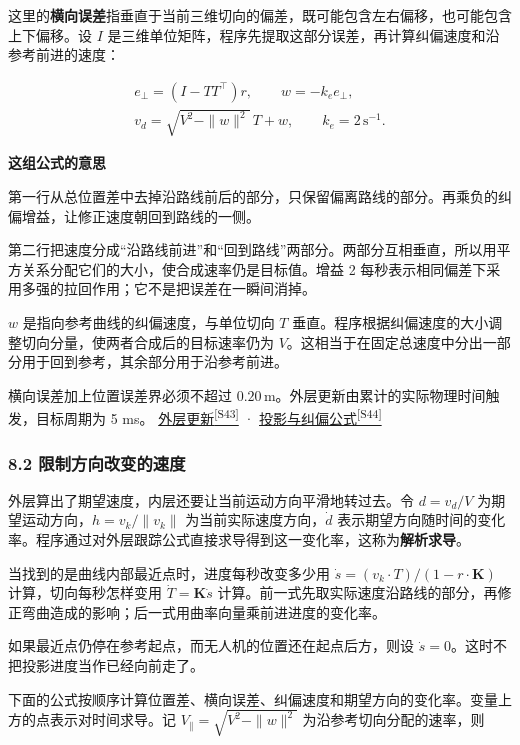 \documentclass[12pt,a4paper]{article}
\numberwithin{equation}{topic}
\newcommand{\sourceref}[2]{\hyperlink{source-#1}{#2\textsuperscript{[#1]}}}
\begin{document}
这里的\textbf{横向误差}指垂直于当前三维切向的偏差，既可能包含左右偏移，也可能包含上下偏移。设 \(I\) 是三维单位矩阵，程序先提取这部分误差，再计算纠偏速度和沿参考前进的速度：

\begin{equation}
\label{eq:cross-track}
\begin{gathered}
e_\perp=(I-TT^\top)r,\qquad
w=-k_e e_\perp,\\
v_d=\sqrt{V^2-\|w\|^2}\,T+w,\qquad
k_e=2\,\mathrm{s^{-1}}.
\end{gathered}
\end{equation}

\noindent\textbf{这组公式的意思}\par\nobreak
第一行从总位置差中去掉沿路线前后的部分，只保留偏离路线的部分。再乘负的纠偏增益，让修正速度朝回到路线的一侧。

第二行把速度分成“沿路线前进”和“回到路线”两部分。两部分互相垂直，所以用平方关系分配它们的大小，使合成速率仍是目标值。增益 2 每秒表示相同偏差下采用多强的拉回作用；它不是把误差在一瞬间消掉。


\(w\) 是指向参考曲线的纠偏速度，与单位切向 \(T\) 垂直。程序根据纠偏速度的大小调整切向分量，使两者合成后的目标速率仍为 \(V\)。这相当于在固定总速度中分出一部分用于回到参考，其余部分用于沿参考前进。

横向误差加上位置误差界必须不超过 \(0.20\,\mathrm m\)。外层更新由累计的实际物理时间触发，目标周期为 5 ms。 \sourceref{S43}{外层更新} · \sourceref{S44}{投影与纠偏公式}

\subsubsection*{8.2 限制方向改变的速度}

外层算出了期望速度，内层还要让当前运动方向平滑地转过去。令 \(d=v_d/V\) 为期望运动方向，\(h=v_k/\|v_k\|\) 为当前实际速度方向，\(\dot d\) 表示期望方向随时间的变化率。程序通过对外层跟踪公式直接求导得到这一变化率，这称为\textbf{解析求导}。

当找到的是曲线内部最近点时，进度每秒改变多少用 \(\dot s=(v_k\cdot T)/(1-r\cdot\mathbf K)\) 计算，切向每秒怎样变用 \(\dot T=\mathbf K\dot s\) 计算。前一式先取实际速度沿路线的部分，再修正弯曲造成的影响；后一式用曲率向量乘前进进度的变化率。

如果最近点仍停在参考起点，而无人机的位置还在起点后方，则设 \(\dot s=0\)。这时不把投影进度当作已经向前走了。

下面的公式按顺序计算位置差、横向误差、纠偏速度和期望方向的变化率。变量上方的点表示对时间求导。记 \(V_\parallel=\sqrt{V^2-\|w\|^2}\) 为沿参考切向分配的速率，则
\end{document}
